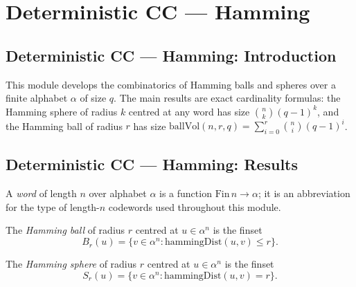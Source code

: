 \section{Deterministic CC --- Hamming}
\subsection*{Deterministic CC --- Hamming: Introduction}

This module develops the combinatorics of Hamming balls and spheres over a finite alphabet
$\alpha$ of size $q$.  The main results are exact cardinality formulas: the Hamming sphere
of radius $k$ centred at any word has size $\binom{n}{k}(q-1)^k$, and the Hamming ball of
radius $r$ has size $\mathrm{ballVol}(n,r,q) = \sum_{i=0}^{r}\binom{n}{i}(q-1)^i$.

\subsection*{Deterministic CC --- Hamming: Results}

\begin{definition}[Word]
\label{CommunicationComplexity.Word}
\leanok
A \emph{word} of length $n$ over alphabet $\alpha$ is a function
$\mathrm{Fin}\,n \to \alpha$; it is an abbreviation for the type of
length-$n$ codewords used throughout this module.
\end{definition}

\begin{definition}
\label{CommunicationComplexity.hammingBall}
\leanok
{}
The \emph{Hamming ball} of radius $r$ centred at $u \in \alpha^n$ is the finset
\[
  B_r(u) = \{v \in \alpha^n : \mathrm{hammingDist}(u,v) \le r\}.
\]
\end{definition}

\begin{definition}
\label{CommunicationComplexity.hammingSphere}
\leanok
{}
The \emph{Hamming sphere} of radius $r$ centred at $u \in \alpha^n$ is the finset
\[
  S_r(u) = \{v \in \alpha^n : \mathrm{hammingDist}(u,v) = r\}.
\]
\end{definition}

